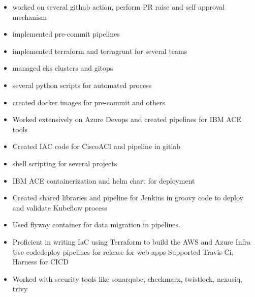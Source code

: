 \documentclass[10pt,a4paper,ragged2e,withhyper]{altacv}
\begin{document}
\begin{paracol}{2}

\begin{itemize}
\item worked on several github action, perform PR raise and self approval mechanism
\item implemented pre-commit pipelines
\item implemented terraform and terragrunt for several teams
\item managed eks clusters and gitops
\item several python scripts for automated process
\item created docker images for pre-commit and others
\end{itemize}

\divider

\begin{itemize}
\item Worked extensively on Azure Devops and created pipelines for IBM ACE tools
\item Created IAC code for CiscoACI and pipeline in gitlab
\item shell scripting for several projects
\item IBM ACE containerization and helm chart for deployment
\end{itemize}

\divider

\begin{itemize}
\item Created shared libraries and pipeline for Jenkins in groovy code to deploy and validate Kubeflow process 
\item Used flyway container for data migration in pipelines. 
\item Proficient in writing IaC using Terraform to build the AWS and Azure Infra Use codedeploy pipelines for release for web apps Supported Travis-Ci, Harness for CICD
\item Worked with security tools like sonarqube, checkmarx, twistlock, nexusiq, trivy
\end{itemize}

\divider


\end{paracol}
\end{document}
